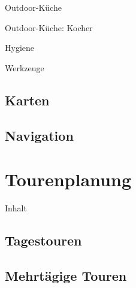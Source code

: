 \documentclass{beamer}
\begin{document}
			\begin{frame}{Outdoor-Küche}
			\end{frame}
			
			\begin{frame}{Outdoor-Küche: Kocher}
			\end{frame}
			
			\begin{frame}{Hygiene}
			\end{frame}
			
			\begin{frame}{Werkzeuge}
			\end{frame}
		
		\subsection{Karten}
			
			\begin{frame}{}
			\end{frame}
		
		\subsection{Navigation}
			
			\begin{frame}{}
			\end{frame}
	
	\section{Tourenplanung}
		
		\begin{frame}[t]{Inhalt}
		\end{frame}
	
		\subsection{Tagestouren}
			
			\begin{frame}{}
			\end{frame}
			
		\subsection{Mehrtägige Touren}
			
			\begin{frame}{}
			\end{frame}
		
\end{document}
